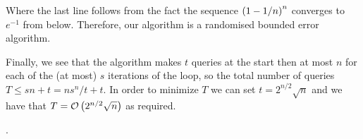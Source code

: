     Where the last line follows from the fact the 
    sequence $\left(1 - 1/n\right)^n$ converges to $e^{-1}$ from below.
    Therefore, our algorithm is a randomised bounded error algorithm.

    Finally, we see that the algorithm makes $t$ queries at the start
    then at most $n$ for each of the (at most) $s$ iterations of the loop,
    so the total number of queries $T \leq sn + t = ns^n/t + t$.
    In order to minimize $T$ we can set $t = 2^{n/2}\sqrt{n}$
    and we have that $T = \mathcal{O}\left(2^{n/2}\sqrt{n}\right)$ as required.


    \newpage
    .

